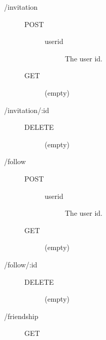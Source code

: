 \begin{description}
\begin{description}
    \end{description}
  \item [/invitation] \hfill
    \begin{description}
      \item [POST] \hfill
        \begin{description}
          \item [userid] The user id.
        \end{description}
      \item [GET] \hfill
        \begin{description}
          \item [(empty)]
        \end{description}
    \end{description}
  \item [/invitation/:id] \hfill
    \begin{description}
      \item [DELETE] \hfill
        \begin{description}
          \item [(empty)]
        \end{description}
    \end{description}
  \item [/follow] \hfill
    \begin{description}
      \item [POST] \hfill
        \begin{description}
          \item [userid] The user id.
        \end{description}
      \item [GET] \hfill
        \begin{description}
          \item [(empty)]
        \end{description}
    \end{description}
  \item [/follow/:id] \hfill
    \begin{description}
      \item [DELETE] \hfill
        \begin{description}
          \item [(empty)]
        \end{description}
    \end{description}
  \item [/friendship] \hfill
    \begin{description}
      \item [GET] \hfill

\end{description}
\end{description}
